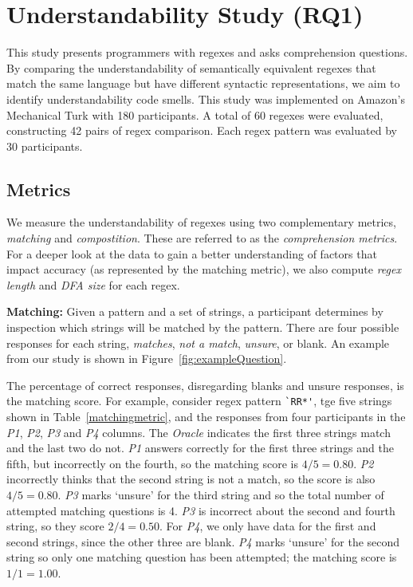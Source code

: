 

\section{Understandability Study (RQ1)}
\label{sec:rq1}
This study presents  programmers with regexes and asks comprehension questions. By comparing the understandability of semantically equivalent regexes that match the same language but have different syntactic representations, we aim to identify understandability code smells.
This study was  implemented on Amazon's Mechanical Turk with 180 participants. A total of 60 regexes were evaluated, constructing 42 pairs of regex comparison. Each regex pattern was evaluated by 30 participants.







\subsection{Metrics}
\label{sec:understadningmetric}
 We measure the understandability of regexes using two complementary metrics, \emph{matching} and \emph{compostition}. These are referred to as the \emph{comprehension metrics}. 
For a deeper look at the data to gain a better understanding of factors that impact accuracy (as represented by the matching metric), we also compute \emph{regex length} and \emph{DFA size} for each regex. 


\textbf{Matching:}
 Given a pattern and a set of strings, a participant determines by inspection which strings will be matched by the pattern. There are four possible responses for each string, \emph{matches}, \emph{not a match}, \emph{unsure}, or blank. An example from our study is shown in Figure~\ref{fig:exampleQuestion}.

 The percentage of correct responses, disregarding blanks and unsure responses, is the matching score.
 For example, consider regex pattern \verb!`RR*'!, tge five strings shown in Table~\ref{matchingmetric}, and the responses from four participants in the \emph{P1}, \emph{P2}, \emph{P3} and \emph{P4} columns.
 The {\em Oracle} indicates  the first three strings match and the last two do not. \emph{P1} answers correctly for the first three strings and the fifth, but incorrectly on the fourth, so the matching score is $4/5 = 0.80$. \emph{P2} incorrectly thinks that the second string is not a match, so the score is also $4/5 = 0.80$.  \emph{P3} marks `unsure' for the third string and so the total number of attempted matching questions is 4. \emph{P3} is incorrect about the second and fourth string, so they score $2/4 = 0.50$.  For \emph{P4}, we only have data for the first and second strings, since the other three are blank.  \emph{P4} marks `unsure' for the second string so only one matching question has been attempted;  the matching score is $1/1 = 1.00$.

